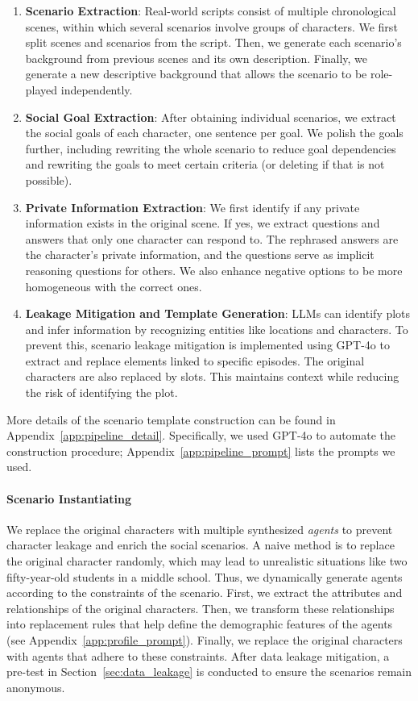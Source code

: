 \begin{enumerate}[(1)]
    \item \textbf{Scenario Extraction}: Real-world scripts consist of multiple chronological scenes, within which several scenarios involve groups of characters.
    We first split scenes and scenarios from the script.
    Then, we generate each scenario's background from previous scenes and its own description.
    Finally, we generate a new descriptive background that allows the scenario to be role-played independently.
    \item \textbf{Social Goal Extraction}: After obtaining individual scenarios, we extract the social goals of each character, one sentence per goal.
    We polish the goals further, including rewriting the whole scenario to reduce goal dependencies and rewriting the goals to meet certain criteria (or deleting if that is not possible).
    \item \textbf{Private Information Extraction}: We first identify if any private information exists in the original scene.
    If yes, we extract questions and answers that only one character can respond to.
    The rephrased answers are the character's private information, and the questions serve as implicit reasoning questions for others.
    We also enhance negative options to be more homogeneous with the correct ones.
    \item \textbf{Leakage Mitigation and Template Generation}: LLMs can identify plots and infer information by recognizing entities like locations and characters.
    To prevent this, scenario leakage mitigation is implemented using GPT-4o to extract and replace elements linked to specific episodes.
    The original characters are also replaced by slots.
    This maintains context while reducing the risk of identifying the plot.
\end{enumerate}

More details of the scenario template construction can be found in Appendix~\ref{app:pipeline_detail}.
Specifically, we used GPT-4o to automate the construction procedure; Appendix~\ref{app:pipeline_prompt} lists the prompts we used.

\paragraph{Scenario Instantiating}
We replace the original characters with multiple synthesized \textit{agents} to prevent character leakage and enrich the social scenarios.
A naive method is to replace the original character randomly, which may lead to unrealistic situations like two fifty-year-old students in a middle school.
Thus, we dynamically generate agents according to the constraints of the scenario.
First, we extract the attributes and relationships of the original characters.
Then, we transform these relationships into replacement rules that help define the demographic features of the agents (see Appendix~\ref{app:profile_prompt}).
Finally, we replace the original characters with agents that adhere to these constraints.
After data leakage mitigation, a pre-test in Section~\ref{sec:data_leakage} is conducted to ensure the scenarios remain anonymous.

